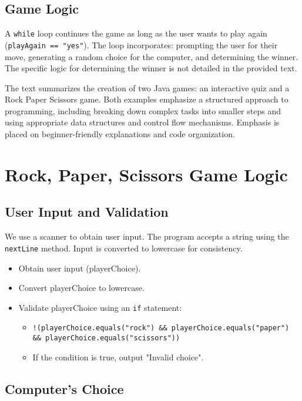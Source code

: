 \documentclass{article}
\begin{document}
\subsection{Game Logic}

A \texttt{while} loop continues the game as long as the user wants to play again (\texttt{playAgain == "yes"}). The loop incorporates: prompting the user for their move, generating a random choice for the computer, and determining the winner.  The specific logic for determining the winner is not detailed in the provided text.

The text summarizes the creation of two Java games: an interactive quiz and a Rock Paper Scissors game.  Both examples emphasize a structured approach to programming, including breaking down complex tasks into smaller steps and using appropriate data structures and control flow mechanisms.  Emphasis is placed on beginner-friendly explanations and code organization.


\section{Rock, Paper, Scissors Game Logic}

\subsection{User Input and Validation}

We use a scanner to obtain user input.  The program accepts a string using the \texttt{nextLine} method.  Input is converted to lowercase for consistency.

\begin{itemize}
    \item Obtain user input (playerChoice).
    \item Convert playerChoice to lowercase.
    \item Validate playerChoice using an \texttt{if} statement:
    \begin{itemize}
        \item \texttt{!(playerChoice.equals("rock") \&\& playerChoice.equals("paper") \&\& playerChoice.equals("scissors"))}
        \item If the condition is true, output "Invalid choice".
    \end{itemize}
\end{itemize}

\subsection{Computer's Choice}
\end{document}
